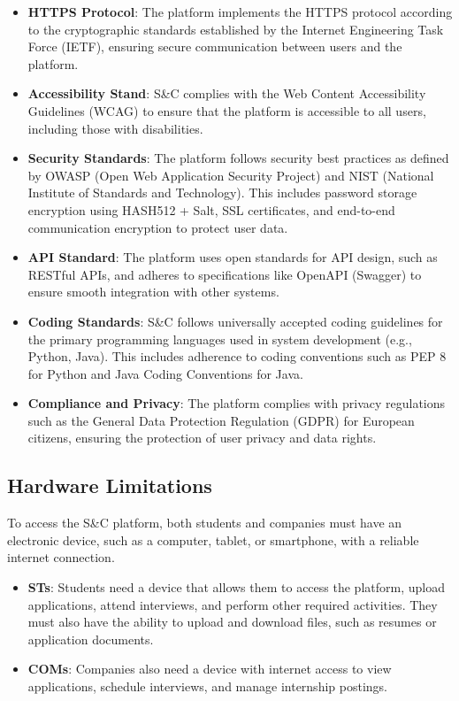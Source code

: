 \begin{itemize}
    \item \textbf{HTTPS Protocol}: The platform implements the HTTPS protocol according to the cryptographic standards established by the Internet Engineering Task Force (IETF), ensuring secure communication between users and the platform.

    \item \textbf{Accessibility Stand}: S\&C complies with the Web Content Accessibility Guidelines (WCAG) to ensure that the platform is accessible to all users, including those with disabilities.

    \item \textbf{Security Standards}: The platform follows security best practices as defined by OWASP (Open Web Application Security Project) and NIST (National Institute of Standards and Technology). This includes password storage encryption using HASH512 + Salt, SSL certificates, and end-to-end communication encryption to protect user data.

    \item \textbf{API Standard}:  The platform uses open standards for API design, such as RESTful APIs, and adheres to specifications like OpenAPI (Swagger) to ensure smooth integration with other systems.

    \item \textbf{Coding Standards}: S\&C follows universally accepted coding guidelines for the primary programming languages used in system development (e.g., Python, Java). This includes adherence to coding conventions such as PEP 8 for Python and Java Coding Conventions for Java.

    \item \textbf{Compliance and Privacy}: The platform complies with privacy regulations such as the General Data Protection Regulation (GDPR) for European citizens, ensuring the protection of user privacy and data rights.
    
\end{itemize}

\subsection{Hardware Limitations}

To access the S\&C platform, both students and companies must have an electronic device, such as a computer, tablet, or smartphone, with a reliable internet connection. 

\begin{itemize}
    \item \textbf{STs}: Students need a device that allows them to access the platform, upload applications, attend interviews, and perform other required activities. They must also have the ability to upload and download files, such as resumes or application documents.

    \item \textbf{COMs}: Companies also need a device with internet access to view applications, schedule interviews, and manage internship postings.
\end{itemize}

